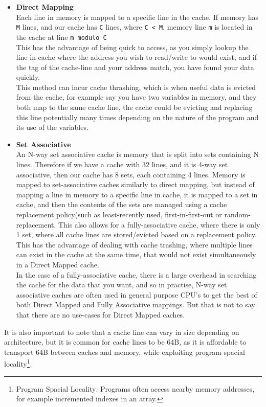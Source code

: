\documentclass[bsc,frontabs,twoside,singlespacing,parskip,deptreport]{infthesis}     %
\begin{document}
\begin{itemize}
    \item{{\bf Direct Mapping} \\ Each line in memory is mapped to a specific line in the cache. If memory has \texttt{M} lines, and our cache has \texttt{C} lines, where \texttt{C < M}, memory line \texttt{m} is located in the cache at line \texttt{m modulo C} \\ This has the advantage of being quick to access, as you simply lookup the line in cache where the address you wish to read/write to would exist, and if the tag of the cache-line and your address match, you have found your data quickly. \\ This method can incur cache thrashing, which is when useful data is evicted from the cache, for example say you have two variables in memory, and they both map to the same cache line, the cache could be evicting and replacing this line potentially many times depending on the nature of the program and its use of the variables.}
    \item{{\bf Set Associative} \\ An N-way set associative cache is memory that is split into sets containing N lines. Therefore if we have a cache with 32 lines, and it is 4-way set associative, then our cache has 8 sets, each containing 4 lines. Memory is mapped to set-associative caches similarly to direct mapping, but instead of mapping a line in memory to a specific line in cache, it is mapped to a set in cache, and then the contents of the sets are managed using a cache replacement policy(such as least-recently used, first-in-first-out or random-replacement. This also allows for a fully-associative cache, where there is only 1 set, where all cache lines are stored/evicted based on a replacement policy. \\ This has the advantage of dealing with cache trashing, where multiple lines can exist in the cache at the same time, that would not exist simultaneously in a Direct Mapped cache. \\ In the case of a fully-associative cache, there is a large overhead in searching the cache for the data that you want, and so in practise, N-way set associative caches are often used in general purpose CPU's to get the best of both Direct Mapped and Fully Associative mappings. But that is not to say that there are no use-cases for Direct Mapped caches.}
\end{itemize}
It is also important to note that a cache line can vary in size depending on architecture, but it is common for cache lines to be 64B, as it is affordable to transport 64B between caches and memory, while exploiting program spacial locality\footnote{Program Spacial Locality: Programs often access nearby memory addresses, for example incremented indexes in an array.}.
\end{document}
